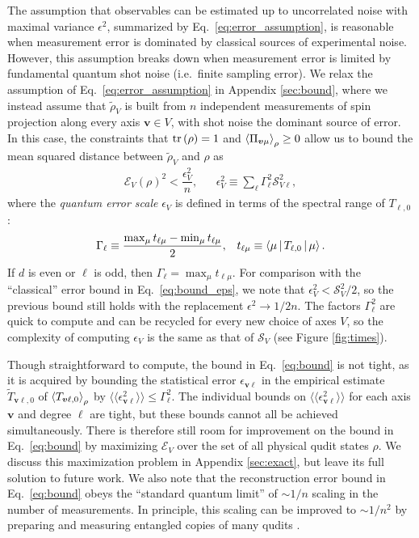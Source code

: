 \documentclass[nofootinbib,twocolumn]{revtex4-1}
\newcommand{\f}[2]{\dfrac{#1}{#2}} %
\newcommand{\p}[1]{\left(#1\right)} %
\newcommand{\bk}{\Braket} %
\newcommand{\bbk}[1]{\langle\!\langle #1 \rangle\!\rangle}
\newcommand{\E}{\mathcal{E}}
\renewcommand{\S}{\mathcal{S}}
\begin{document}
The assumption that observables can be estimated up to uncorrelated noise with maximal variance $\epsilon^2$, summarized by Eq.~\eqref{eq:error_assumption}, is reasonable when measurement error is dominated by classical sources of experimental noise.
However, this assumption breaks down when measurement error is limited by fundamental quantum shot noise (i.e.~finite sampling error).
We relax the assumption of Eq.~\eqref{eq:error_assumption} in Appendix \ref{sec:bound}, where we instead assume that $\tilde\rho_V$ is built from $n$ independent measurements of spin projection along every axis $\bm v\in V$, with shot noise the dominant source of error.
In this case, the constraints that $\tr\p\rho=1$ and $\bk{\Pi_{\bm v\mu}}_\rho\ge0$ allow us to bound the mean squared distance between $\tilde\rho_V$ and $\rho$ as
\begin{align}
  \E_V\p{\rho}^2 < \f{\epsilon_V^2}{n},
  &&
  \epsilon_V^2 \equiv \sum_\ell \Gamma_\ell^2 \S_{V\ell}^2,
  \label{eq:bound}
\end{align}
where the {\it quantum error scale} $\epsilon_V$ is defined in terms of the spectral range of $T_{\ell,0}$:
\begin{align}
  \Gamma_\ell \equiv \f{\max_\mu t_{\ell\mu} - \min_\mu t_{\ell\mu}}{2},
  &&
  t_{\ell\mu} \equiv \bk{\mu|T_{\ell,0}|\mu}.
\end{align}
If $d$ is even or $\ell$ is odd, then $\Gamma_\ell=\max_\mu t_{\ell\mu}$.
For comparison with the ``classical'' error bound in Eq.~\eqref{eq:bound_eps}, we note that $\epsilon_V^2<\S_V^2/2$, so the previous bound still holds with the replacement $\epsilon^2\to1/2n$.
The factors $\Gamma_\ell^2$ are quick to compute and can be recycled for every new choice of axes $V$, so the complexity of computing $\epsilon_V$ is the same as that of $\S_V$ (see Figure \ref{fig:times}).

Though straightforward to compute, the bound in Eq.~\eqref{eq:bound} is not tight, as it is acquired by bounding the statistical error $\epsilon_{\bm v\ell}$ in the empirical estimate $\tilde T_{\bm v\ell,0}$ of $\bk{T_{\bm v\ell,0}}_\rho$ by $\bbk{\epsilon_{\bm v\ell}^2}\le\Gamma_\ell^2$.
The individual bounds on $\bbk{\epsilon_{\bm v\ell}^2}$ for each axis $\bm v$ and degree $\ell$ are tight, but these bounds cannot all be achieved simultaneously.
There is therefore still room for improvement on the bound in Eq.~\eqref{eq:bound} by maximizing $\E_V$ over the set of all physical qudit states $\rho$.
We discuss this maximization problem in Appendix \ref{sec:exact}, but leave its full solution to future work.
We also note that the reconstruction error bound in Eq.~\eqref{eq:bound} obeys the ``standard quantum limit'' of $\sim1/n$ scaling in the number of measurements.
In principle, this scaling can be improved to $\sim1/n^2$ by preparing and measuring entangled copies of many qudits \cite{giovannetti2006quantum}.
\end{document}
